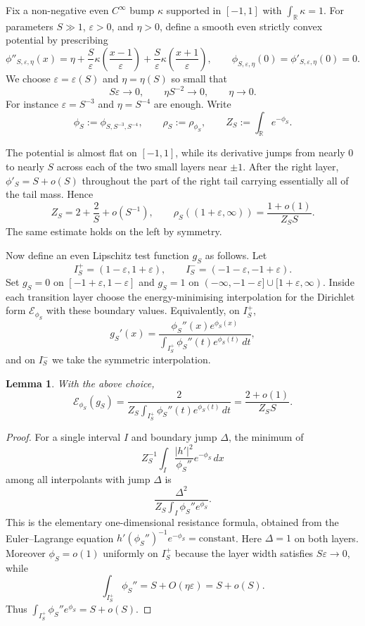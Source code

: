 \documentclass{article}
\newtheorem{lemma}[theorem]{Lemma}
\theoremstyle{remark}
\begin{document}
Fix a non-negative even $C^\infty$ bump $\kappa$ supported in $[-1,1]$ with
$\int_{\mathbb R}\kappa=1$.  For parameters $S\gg1$, $\varepsilon>0$, and
$\eta>0$, define a smooth even strictly convex potential by prescribing
\[
  \phi''_{S,\varepsilon,\eta}(x)
  =
  \eta
  + \frac S\varepsilon\kappa\!\left(\frac{x-1}{\varepsilon}\right)
  + \frac S\varepsilon\kappa\!\left(\frac{x+1}{\varepsilon}\right),
  \qquad
  \phi_{S,\varepsilon,\eta}(0)=\phi'_{S,\varepsilon,\eta}(0)=0.
\]
We choose $\varepsilon=\varepsilon(S)$ and $\eta=\eta(S)$ so small that
\[
  S\varepsilon\to0,\qquad \eta S^{-2}\to0,\qquad \eta\to0.
\]
For instance $\varepsilon=S^{-3}$ and $\eta=S^{-4}$ are enough.  Write
\[
  \phi_S:=\phi_{S,S^{-3},S^{-4}},
  \qquad
  \rho_S:=\rho_{\phi_S},
  \qquad
  Z_S:=\int_{\mathbb R}e^{-\phi_S}.
\]

The potential is almost flat on $[-1,1]$, while its derivative jumps from nearly
$0$ to nearly $S$ across each of the two small layers near $\pm1$.  After the
right layer, $\phi'_S=S+o(S)$ throughout the part of the right tail carrying
essentially all of the tail mass.  Hence
\begin{equation}\label{eq:normalization}
  Z_S = 2+\frac{2}{S}+o(S^{-1}),
  \qquad
  \rho_S((1+\varepsilon,\infty))
  =
  \frac{1+o(1)}{Z_S S}.
\end{equation}
The same estimate holds on the left by symmetry.

Now define an even Lipschitz test function $g_S$ as follows.  Let
\[
  I_S^+=(1-\varepsilon,1+\varepsilon),\qquad
  I_S^-=(-1-\varepsilon,-1+\varepsilon).
\]
Set $g_S=0$ on $[-1+\varepsilon,1-\varepsilon]$ and $g_S=1$ on
$(-\infty,-1-\varepsilon]\cup[1+\varepsilon,\infty)$.  Inside each transition
layer choose the energy-minimising interpolation for the Dirichlet form
$\mathcal E_{\phi_S}$ with these boundary values.  Equivalently, on $I_S^+$,
\[
  g_S'(x)
  =
  \frac{\phi_S''(x)e^{\phi_S(x)}}{\int_{I_S^+}\phi_S''(t)e^{\phi_S(t)}\,dt},
\]
and on $I_S^-$ we take the symmetric interpolation.

\begin{lemma}\label{lem:energy}
With the above choice,
\[
  \mathcal E_{\phi_S}(g_S)
  =
  \frac{2}{Z_S\int_{I_S^+}\phi_S''(t)e^{\phi_S(t)}\,dt}
  =
  \frac{2+o(1)}{Z_S S}.
\]
\end{lemma}

\begin{proof}
For a single interval $I$ and boundary jump $\Delta$, the minimum of
\[
  Z_S^{-1}\int_I \frac{|h'|^2}{\phi_S''}e^{-\phi_S}\,dx
\]
among all interpolants with jump $\Delta$ is
\[
  \frac{\Delta^2}{Z_S\int_I \phi_S''e^{\phi_S}}.
\]
This is the elementary one-dimensional resistance formula, obtained from the
Euler--Lagrange equation
$h'(\phi_S'')^{-1}e^{-\phi_S}=\text{constant}$.  Here $\Delta=1$ on both layers.
Moreover $\phi_S=o(1)$ uniformly on $I_S^+$ because the layer width satisfies
$S\varepsilon\to0$, while
\[
  \int_{I_S^+}\phi_S''=S+O(\eta\varepsilon)=S+o(S).
\]
Thus $\int_{I_S^+}\phi_S''e^{\phi_S}=S+o(S)$.
\end{proof}
\end{document}

